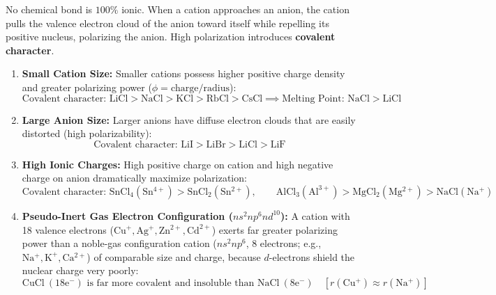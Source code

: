 \documentclass[10pt,a4paper]{article}
\begin{document}
\begin{conceptbox}
No chemical bond is $100\%$ ionic. When a cation approaches an anion, the cation pulls the valence electron cloud of the anion toward itself while repelling its positive nucleus, polarizing the anion. High polarization introduces \textbf{covalent character}.
\begin{enumerate}
  \item \textbf{Small Cation Size:} Smaller cations possess higher positive charge density and greater polarizing power ($\phi = \text{charge}/\text{radius}$):
  \begin{equation}
    \text{Covalent character: } \mathrm{LiCl > NaCl > KCl > RbCl > CsCl} \implies \text{Melting Point: } \mathrm{NaCl > LiCl}
  \end{equation}
  \item \textbf{Large Anion Size:} Larger anions have diffuse electron clouds that are easily distorted (high polarizability):
  \begin{equation}
    \text{Covalent character: } \mathrm{LiI > LiBr > LiCl > LiF}
  \end{equation}
  \item \textbf{High Ionic Charges:} High positive charge on cation and high negative charge on anion dramatically maximize polarization:
  \begin{equation}
    \text{Covalent character: } \mathrm{SnCl_4 (Sn^{4+}) > SnCl_2 (Sn^{2+})}, \qquad \mathrm{AlCl_3 (Al^{3+}) > MgCl_2 (Mg^{2+}) > NaCl (Na^+)}
  \end{equation}
  \item \textbf{Pseudo-Inert Gas Electron Configuration ($ns^2 np^6 nd^{10}$):}
  A cation with 18 valence electrons ($\mathrm{Cu^+, Ag^+, Zn^{2+}, Cd^{2+}}$) exerts far greater polarizing power than a noble-gas configuration cation ($ns^2 np^6$, 8 electrons; e.g., $\mathrm{Na^+, K^+, Ca^{2+}}$) of comparable size and charge, because $d$-electrons shield the nuclear charge very poorly:
  \begin{equation}
    \mathrm{CuCl\ (18e^-)} \text{ is far more covalent and insoluble than } \mathrm{NaCl\ (8e^-)} \quad [r(\mathrm{Cu^+}) \approx r(\mathrm{Na^+})]
  \end{equation}
\end{enumerate}
\end{conceptbox}
\end{document}
